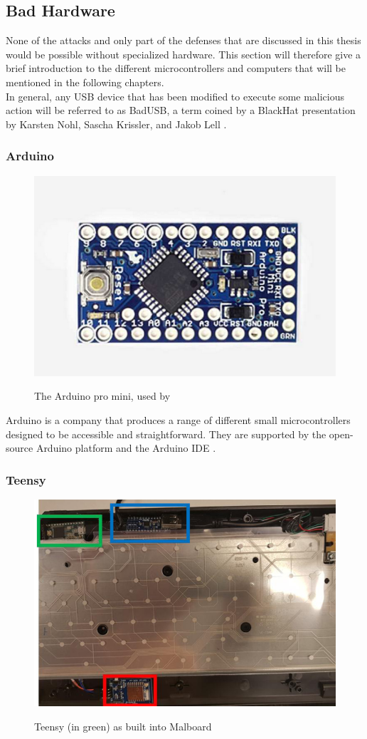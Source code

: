 \subsection{Bad Hardware}

None of the attacks and only part of the defenses that are discussed in this thesis would be possible without specialized hardware. This section will therefore give a brief introduction to the different microcontrollers and computers that will be mentioned in the following chapters.\\
In general, any USB device that has been modified to execute some malicious action will be referred to as BadUSB, a term coined by a BlackHat presentation by Karsten Nohl, Sascha Krissler, and Jakob Lell \cite{Srlabsbadusbblackhatv1Pdf2014}. 


\subsubsection{Arduino}

\begin{figure}[H]
    \centering
    \includegraphics[width=0.25\linewidth]{visuals/arduinomini.png}
    \caption{The Arduino pro mini, used by \cite{bojovicRisingThreatHardware2019}}
    \label{fig:ArduinoProMini}
    \cite{ArduinoProMini}
\end{figure}
Arduino \cite{ArduinoHardware} is a company that produces a range of different small microcontrollers designed to be accessible and straightforward. They are supported by the open-source Arduino platform and the Arduino IDE \cite{ArduinoArduino2024}.


\subsubsection{Teensy}

\begin{figure}[H]
    \centering
    \includegraphics[width=0.5\linewidth]{visuals/teensy.png}
    \caption{Teensy (in green) as built into Malboard}
    \label{fig:builtInTeensy}
    \cite{farhiMalboardNovelUser2019}
\end{figure}

